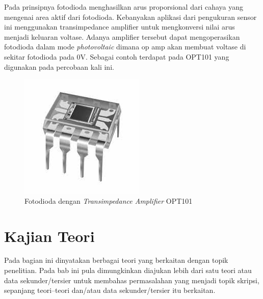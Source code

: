 Pada prinsipnya fotodioda menghasilkan arus proporsional dari cahaya yang mengenai area aktif dari
fotodioda. Kebanyakan aplikasi dari pengukuran sensor ini menggunakan transimpedance amplifier
untuk mengkonversi nilai arus menjadi keluaran voltase. Adanya amplifier tersebut dapat
mengoperasikan fotodioda dalam mode \textit{photovoltaic} dimana op amp akan membuat voltase di
sekitar fotodioda pada 0V. Sebagai contoh terdapat pada OPT101 yang digunakan pada percobaan kali
ini.

\begin{figure}[H]
    \centering
    \includegraphics{Images/OPT101.jpg}
    \caption{Fotodioda dengan \textit{Transimpedance Amplifier} OPT101}
    \label{fig:opt101}
\end{figure}


\section{Kajian Teori}
Pada bagian ini dinyatakan berbagai teori yang berkaitan dengan topik penelitian. Pada bab ini pula dimungkinkan diajukan lebih dari satu teori atau data sekunder/tersier untuk membahas permasalahan yang menjadi topik skripsi, sepanjang teori–teori dan/atau data sekunder/tersier itu berkaitan.

